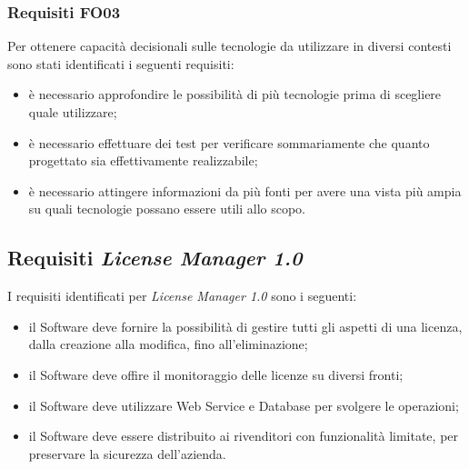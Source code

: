 \subsubsection{Requisiti FO03}

Per ottenere capacità decisionali sulle tecnologie da utilizzare in diversi contesti sono stati identificati i seguenti requisiti:

\begin{itemize}
\item è necessario approfondire le possibilità di più tecnologie prima di scegliere quale utilizzare;
\item è necessario effettuare dei test per verificare sommariamente che quanto progettato sia effettivamente realizzabile;
\item è necessario attingere informazioni da più fonti per avere una vista più ampia su quali tecnologie possano essere utili allo scopo. 
\end{itemize}

\subsection{Requisiti \textit{License Manager 1.0}}

I requisiti identificati per \textit{License Manager 1.0} sono i seguenti:

\begin{itemize}
\item il Software deve fornire la possibilità di gestire tutti gli aspetti di una licenza, dalla creazione alla modifica, fino all'eliminazione;
\item il Software deve offire il monitoraggio delle licenze su diversi fronti;
\item il Software deve utilizzare Web Service e Database per svolgere le operazioni;
\item il Software deve essere distribuito ai rivenditori con funzionalità limitate, per preservare la sicurezza dell'azienda.
\end{itemize}
